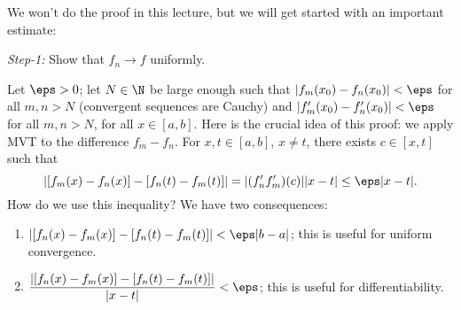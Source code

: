 \medskip

We won't do the proof in this lecture, but we will get started with an important estimate:

\medskip

\emph{Step-1:} Show that \(f_n\to f\) uniformly. 

\medskip

Let \(\eps>0\); let \(N\in\N\) be large enough such that \(|f_m(x_0)-f_n(x_0)|<\eps\) for all \(m,n>N\) (convergent sequences are Cauchy) and \(|f'_m(x_0)-f'_n(x_0)|<\eps\) for all \(m,n>N\), for all \(x\in[a,b]\). Here is the crucial idea of this proof: we apply MVT to the difference \(f_m-f_n\). For \(x,t\in [a,b]\), \(x\neq t\), there exists \(c\in [x,t]\) such that 
\begin{equation*}
	|[f_m(x)-f_n(x)]-[f_n(t)-f_m(t)]|=|(f_n'f_m')(c)||x-t|\leq \eps|x-t|.
\end{equation*}
How do we use this inequality? We have two consequences:
\begin{enumerate}
	\item \(|[f_n(x)-f_m(x)]-[f_n(t)-f_m(t)]|<\eps|b-a|\); this is useful for uniform convergence.
	
	\item \(\displaystyle\frac{|[f_n(x)-f_m(x)]-[f_n(t)-f_m(t)]|}{|x-t|}<\eps\); this is useful for differentiability.
\end{enumerate}